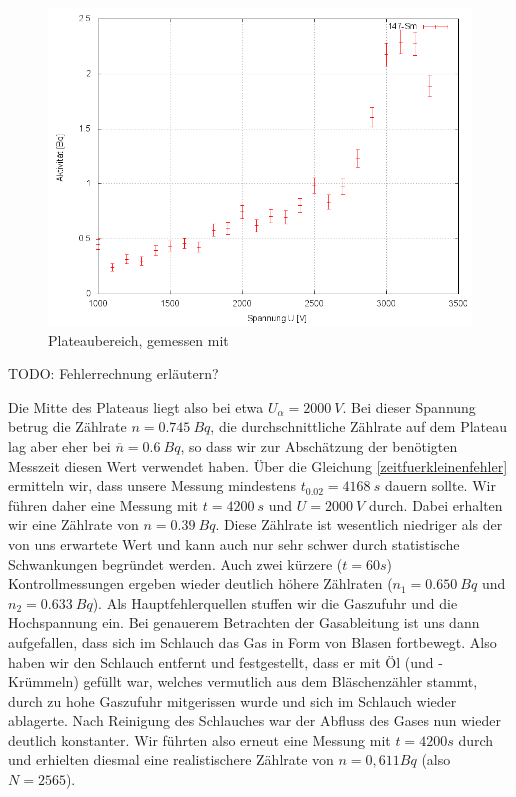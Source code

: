\begin{figure}[H]
 \centering \includegraphics[width=0.9\linewidth]{Messwerte/plots/Sm147_plateau.png}
 \caption{Plateaubereich, gemessen mit }
\end{figure}

TODO: Fehlerrechnung erläutern?

Die Mitte des Plateaus liegt also bei etwa $U_{\alpha} = 2000\ V$. Bei dieser Spannung betrug die Zählrate $n = 0.745\ Bq$, die durchschnittliche Zählrate auf dem Plateau lag aber eher bei $\overline{n} = 0.6\ Bq$, so dass wir zur Abschätzung der benötigten Messzeit diesen Wert verwendet haben. Über die Gleichung \ref{zeitfuerkleinenfehler} ermitteln wir, dass unsere Messung mindestens $t_{0.02} = 4168\ s$ dauern sollte. Wir führen daher eine Messung mit $t = 4200\ s$ und $ U = 2000\ V$ durch. Dabei erhalten wir eine Zählrate von $n = 0.39\ Bq$. Diese Zählrate ist wesentlich niedriger als der von uns erwartete Wert und kann auch nur sehr schwer durch statistische Schwankungen begründet werden. Auch zwei kürzere ($t = 60s$) Kontrollmessungen ergeben wieder deutlich höhere Zählraten ($n_1 = 0.650\ Bq$ und $n_2 = 0.633\ Bq$). Als Hauptfehlerquellen stuffen wir die Gaszufuhr und die Hochspannung ein. Bei genauerem Betrachten der Gasableitung ist uns dann aufgefallen, dass sich im Schlauch das Gas in Form von Blasen fortbewegt. Also haben wir den Schlauch entfernt und festgestellt, dass er mit Öl (und -Krümmeln) gefüllt war, welches vermutlich aus dem Bläschenzähler stammt, durch zu hohe Gaszufuhr mitgerissen wurde und sich im Schlauch wieder ablagerte. Nach Reinigung des Schlauches war der Abfluss des Gases nun wieder deutlich konstanter. Wir führten also erneut eine Messung mit $t=4200s$ durch und erhielten diesmal eine realistischere Zählrate von $n = 0,611 Bq$ (also $N = 2565$). 

